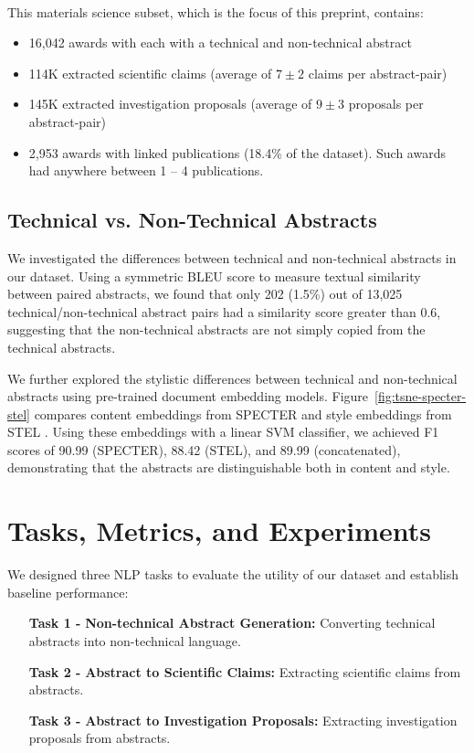 \documentclass[11pt]{article}
\begin{document}
\paragraph{\DatasetNameMatSci} This materials science subset, which is the focus of this preprint, contains:
\begin{itemize}[noitemsep,topsep=0pt]
\item 16,042 awards with each with a technical and non-technical abstract
\item 114K extracted scientific claims (average of $7\pm2$ claims per abstract-pair)
\item 145K extracted investigation proposals (average of $9\pm3$ proposals per abstract-pair)
\item 2,953 awards with linked publications (18.4\% of the dataset). Such awards had anywhere between 1 -- 4 publications.
\end{itemize}

\subsection{Technical vs. Non-Technical Abstracts}
We investigated the differences between technical and non-technical abstracts in our dataset. Using a symmetric BLEU score to measure textual similarity between paired abstracts, we found that only 202 (1.5\%) out of 13,025 technical/non-technical abstract pairs had a similarity score greater than 0.6, suggesting that the non-technical abstracts are not simply copied from the technical abstracts.

We further explored the stylistic differences between technical and non-technical abstracts using pre-trained document embedding models. Figure~\ref{fig:tsne-specter-stel} compares content embeddings from SPECTER \cite{cohan-etal-2020-specter} and style embeddings from STEL \cite{patel2025}. Using these embeddings with a linear SVM classifier, we achieved F1 scores of 90.99 (SPECTER), 88.42 (STEL), and 89.99 (concatenated), demonstrating that the abstracts are distinguishable both in content and style.

\section{Tasks, Metrics, and Experiments}

We designed three NLP tasks to evaluate the utility of our dataset and establish baseline performance:

\begin{itemize}[noitemsep, wide, labelwidth=!, labelindent=0pt]
\item [\textbf{Task 1 -}] \textbf{Non-technical Abstract Generation:} Converting technical abstracts into non-technical language.
\item [\textbf{Task 2 -}]\textbf{Abstract to Scientific Claims:} Extracting scientific claims from abstracts.
\item [\textbf{Task 3 -}]\textbf{Abstract to Investigation Proposals:} Extracting investigation proposals from abstracts.
\end{itemize}
\end{document}
